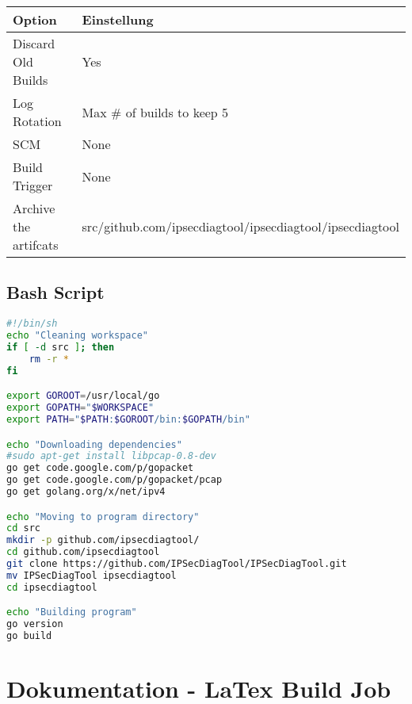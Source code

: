 \begin{table}[h]
\begin{tabular}{|l|l|}
\hline
\rowcolor[HTML]{C0C0C0} 
{\color[HTML]{000000} \textbf{Option}} & {\color[HTML]{000000} \textbf{Einstellung}}              \\ \hline
Discard Old Builds                          & Yes                                                      \\ \hline
Log Rotation                                & Max \# of builds to keep 5                               \\ \hline
SCM                                         & None                                                     \\ \hline
Build Trigger                               & None                                                     \\ \hline
Archive the artifcats                       & src/github.com/ipsecdiagtool/ipsecdiagtool/ipsecdiagtool \\ \hline
\end{tabular}
\end{table}

\subsection{Bash Script}
\begin{lstlisting}[language=bash]
#!/bin/sh
echo "Cleaning workspace"
if [ -d src ]; then
	rm -r *
fi

export GOROOT=/usr/local/go
export GOPATH="$WORKSPACE"
export PATH="$PATH:$GOROOT/bin:$GOPATH/bin"

echo "Downloading dependencies"
#sudo apt-get install libpcap-0.8-dev
go get code.google.com/p/gopacket
go get code.google.com/p/gopacket/pcap
go get golang.org/x/net/ipv4

echo "Moving to program directory"
cd src
mkdir -p github.com/ipsecdiagtool/
cd github.com/ipsecdiagtool
git clone https://github.com/IPSecDiagTool/IPSecDiagTool.git
mv IPSecDiagTool ipsecdiagtool
cd ipsecdiagtool

echo "Building program"
go version
go build
\end{lstlisting}



\section{Dokumentation - LaTex Build Job}

